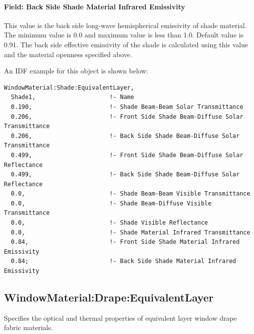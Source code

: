 \paragraph{Field: Back Side Shade Material Infrared Emissivity}\label{field-back-side-shade-material-infrared-emissivity}

This value is the back side long-wave hemispherical emissivity of shade material. The minimum value is 0.0 and maximum value is less than 1.0. Default value is 0.91. The back side effective emissivity of the shade is calculated using this value and the material openness specified above.

An IDF example for this object is shown below:

\begin{lstlisting}
WindowMaterial:Shade:EquivalentLayer,
  Shade1,                     !- Name
  0.190,                      !- Shade Beam-Beam Solar Transmittance
  0.206,                      !- Front Side Shade Beam-Diffuse Solar Transmittance
  0.206,                      !- Back Side Shade Beam-Diffuse Solar Transmittance
  0.499,                      !- Front Side Shade Beam-Diffuse Solar Reflectance
  0.499,                      !- Back Side Shade Beam-Diffuse Solar Reflectance
  0.0,                        !- Shade Beam-Beam Visible Transmittance
  0.0,                        !- Shade Beam-Diffuse Visible Transmittance
  0.0,                        !- Shade Visible Reflectance
  0.0,                        !- Shade Material Infrared Transmittance
  0.84,                       !- Front Side Shade Material Infrared Emissivity
  0.84;                       !- Back Side Shade Material Infrared Emissivity
\end{lstlisting}

\subsection{WindowMaterial:Drape:EquivalentLayer}\label{windowmaterialdrapeequivalentlayer}

Specifies the optical and thermal properties of equivalent layer window drape fabric materials.

